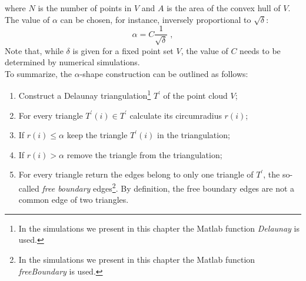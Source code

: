 where $N$ is the number of points in $V$ and $A$ is the area of the convex hull of $V$.
The value of $\alpha$ can be chosen, for instance, inversely proportional to $\sqrt{\delta}$:
\begin{equation}
\alpha=C\frac{1}{\sqrt{\delta}}\;,
\end{equation}
Note that, while $\delta$ is given for a fixed point set $V$, the value of $C$ needs to be determined by numerical simulations.\\ \indent 
To summarize, the $\alpha$-shape construction can be outlined as follows:
\begin{enumerate}
\item Construct a Delaunay triangulation\footnote{In the simulations we present in this chapter the Matlab function \textit{Delaunay} is used.} $T^\prime$ of the point cloud $V$;
\item For every triangle $T^\prime(i)\in T^\prime$ calculate its circumradius $r(i)$;
\item If $r(i)\leq\alpha$ keep the triangle $T^\prime(i)$ in the triangulation;
\item If $r(i)>\alpha$ remove the triangle from the triangulation;
\item For every triangle return the edges belong to only one triangle of $T^{\prime}$, the so-called \textit{free boundary} edges\footnote{In the simulations we present in this chapter the Matlab function \textit{freeBoundary} is used.}. By definition, the free boundary edges are not a common edge of two triangles.
\end{enumerate}
